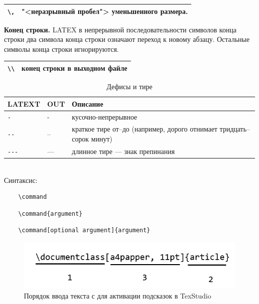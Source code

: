 \begin{table}[h!]
    \begin{tabular}{|l|p{}|}
        \hline
        \verb|\,| & "<неразрывный пробел"> уменьшенного размера.\\
        \hline
    \end{tabular}
\end{table}

\textbf{Конец строки.} LATEX в непрерывной последовательности символов конца строки два символа конца строки означают переход к новому абзацу. Остальные символы конца строки игнорируются.

\begin{table}[h!]
    \begin{tabular}{|l|p{}|}
        \hline
        \verb|\\| & конец строки в выходном файле\\
        \hline
    \end{tabular}
\end{table}

\begin{table}[h!]
    \caption{Дефисы и тире}
    \begin{tabular}{|l|l|p{}|}
        \hline
        \textbf{LATEXT} &
        \textbf{OUT}    &
        \textbf{Описание} \\ \hline
        \verb|-| & - & кусочно-непрерывное \\ \hline
        \verb|--| & -- & краткое тире от--до (например, дорого отнимает тридцать--сорок минут) \\ \hline
        \verb|---| & --- & длинное тире --- знак препинания \\ \hline
    \end{tabular}
\end{table}

\\

Синтаксис:
\begin{verbatim}
    \command
\end{verbatim}

\begin{verbatim}
    \command{argument}
\end{verbatim}

\begin{verbatim}
    \command[optional argument]{argument}
\end{verbatim}

\begin{figure}[h]
    \includegraphics{fig/input_sequence_for_help.png}
    \caption{Порядок ввода текста с для активации подсказок в TexStudio}
\end{figure}


\clearpage